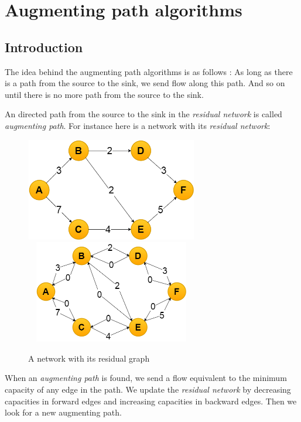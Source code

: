 \section{Augmenting path algorithms}
\subsection{Introduction}
The idea behind the augmenting path algorithms is as follows : 
As long as there is a path from the source to the sink, we send flow along this path. And so on until there is no more path from the source to the sink. \newline

An directed path from the source to the sink in the \textit{residual network} is called \textit{augmenting path}. For instance here is a network with its \textit{residual network}: \newline

\begin{figure}[!h]
\includegraphics[width=7.5cm,height=4.5cm]{images/graph.png}\hfill
\includegraphics[width=7.5cm,height=4.5cm]{images/residualgraph.png}
\caption{A network with its residual graph}
\end{figure}


When an \textit{augmenting path} is found, we send a flow equivalent to the minimum capacity of any edge in the path. We update the \textit{residual network} by decreasing capacities in forward edges and increasing capacities in backward edges. Then we look for a new augmenting path. \newline

